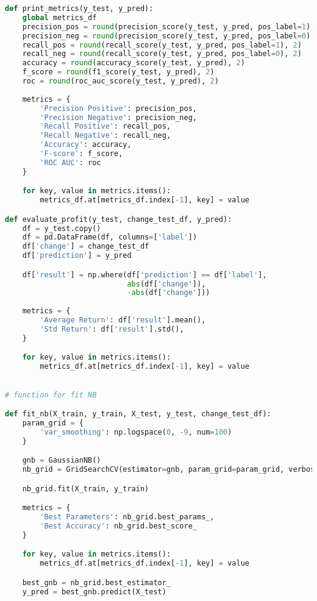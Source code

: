 \begin{lstlisting}[language=Python]
def print_metrics(y_test, y_pred):
    global metrics_df
    precision_pos = round(precision_score(y_test, y_pred, pos_label=1), 2)
    precision_neg = round(precision_score(y_test, y_pred, pos_label=0), 2)
    recall_pos = round(recall_score(y_test, y_pred, pos_label=1), 2)
    recall_neg = round(recall_score(y_test, y_pred, pos_label=0), 2)
    accuracy = round(accuracy_score(y_test, y_pred), 2)
    f_score = round(f1_score(y_test, y_pred), 2)
    roc = round(roc_auc_score(y_test, y_pred), 2)
    
    metrics = {
        'Precision Positive': precision_pos,
        'Precision Negative': precision_neg,
        'Recall Positive': recall_pos,
        'Recall Negative': recall_neg,
        'Accuracy': accuracy,
        'F-score': f_score,
        'ROC AUC': roc
    }

    for key, value in metrics.items():
        metrics_df.at[metrics_df.index[-1], key] = value

def evaluate_profit(y_test, change_test_df, y_pred):
    df = y_test.copy()
    df = pd.DataFrame(df, columns=['label'])
    df['change'] = change_test_df
    df['prediction'] = y_pred

    df['result'] = np.where(df['prediction'] == df['label'],
                            abs(df['change']),
                            -abs(df['change']))
    
    metrics = {
        'Average Return': df['result'].mean(),
        'Std Return': df['result'].std(),
    }

    for key, value in metrics.items():
        metrics_df.at[metrics_df.index[-1], key] = value
    

# function for fit NB

def fit_nb(X_train, y_train, X_test, y_test, change_test_df):
    param_grid = {
        'var_smoothing': np.logspace(0, -9, num=100)
    }

    gnb = GaussianNB()
    nb_grid = GridSearchCV(estimator=gnb, param_grid=param_grid, verbose=1, cv=5, scoring='accuracy', n_jobs=-1)

    nb_grid.fit(X_train, y_train)

    metrics = {
        'Best Parameters': nb_grid.best_params_,
        'Best Accuracy': nb_grid.best_score_
    }

    for key, value in metrics.items():
        metrics_df.at[metrics_df.index[-1], key] = value

    best_gnb = nb_grid.best_estimator_
    y_pred = best_gnb.predict(X_test)


\end{lstlisting}
